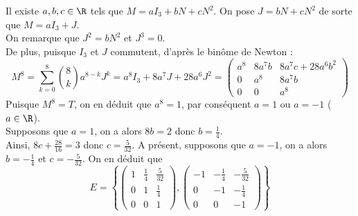 \documentclass[8pt]{book}
\begin{document}
\begin{enumerate}[leftmargin=*]
		Il existe $a,b,c\in\R$ tels que $M=aI_3+bN+cN^2$.
		On pose $J=bN+cN^2$ de sorte que $M=aI_3+J$.\\
		On remarque que $J^2=bN^2$ et $J^3=0$.\\
		De plus, puisque $I_3$ et $J$ commutent, d'après le binôme de Newton :
		\[M^8=\sum_{k=0}^{8}\binom{8}{k}a^{8-k}J^k=a^8I_3+8a^7J+28a^6J^2=\begin{pmatrix}
			a^8&8a^7b&8a^7c+28a^6b^2\\
			0&a^8&8a^7b\\
			0&0&a^8
		\end{pmatrix}\]
		Puisque $M^8=T$, on en déduit que $a^8=1$, par conséquent $a=1$ ou $a=-1$ ($a\in\R$).\\
		Supposons que $a=1$, on a alors $8b=2$ donc $b=\frac{1}{4}$.\\
		Ainsi, $8c+\frac{28}{16}=3$ donc $c=\frac{5}{32}$.
		A présent, supposons que $a=-1$, on a alors $b=-\frac{1}{4}$ et $c=-\frac{5}{32}$.
		On en déduit que \[E=\left\{\begin{pmatrix}
			1&\frac{1}{4}&\frac{5}{32}\\
			0&1&\frac{1}{4}\\
			0&0&1
		\end{pmatrix}, \begin{pmatrix}
		-1&-\frac{1}{4}&-\frac{5}{32}\\
		0&-1&-\frac{1}{4}\\
		0&0&-1
		\end{pmatrix}\right\}\]
	\end{enumerate}
\end{document}
